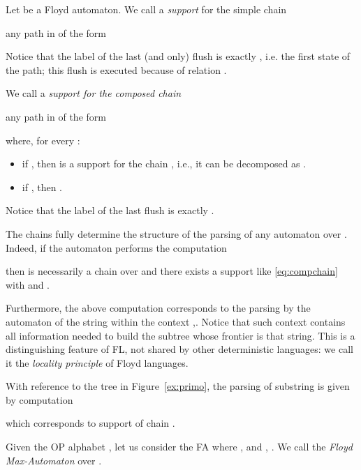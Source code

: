 \documentclass[10pt,a4paper,runningheads]{llncs}
\begin{document}
\begin{definition}
Let  be a Floyd automaton.
We call a \emph{support} for the simple chain

any path in  of the form




Notice that the label of the last (and only) flush is exactly , i.e. the first state of the path; this flush is executed because of relation .


We call a \emph{support for the composed chain} 

any path in  of the form

where, for every : 

\begin{itemize}
\item if , then  
is a support for the chain , i.e.,
it can be decomposed as .


\item if , then .
\end{itemize}
Notice that the label of the last flush is exactly .
\end{definition}





The chains fully determine the structure of the parsing of any
automaton over . Indeed, if the automaton performs the computation

then  
is necessarily a chain over  and there exists a support
like \eqref{eq:compchain} with  and .

Furthermore, the above computation corresponds to the parsing by the
automaton of the string  within the
context ,. Notice that such context contains all
information needed to build the subtree whose frontier is that string.
This is a distinguishing feature of FL, not shared by other
deterministic languages: we call it the \emph{locality principle} of Floyd languages. 


\begin{example}
With reference to the tree in Figure~\ref{ex:primo}, the
parsing of substring  
is given by computation

which corresponds to 
support 
 of chain .
\end{example}



\begin{definition}\label{def:maxfa}
Given the OP alphabet ,  let us consider the FA
    where  , and ,
.
We call  the \emph{Floyd Max-Automaton} over .
\end{definition}
\end{document}
